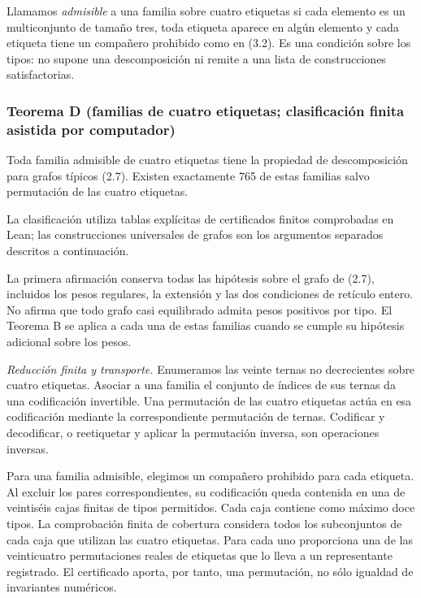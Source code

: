 \documentclass[spanish,11pt,a4paper]{article}
\begin{document}
Llamamos \emph{admisible} a una familia sobre cuatro etiquetas si cada elemento es un multiconjunto de tamaño tres, toda etiqueta aparece en algún elemento y cada etiqueta tiene un compañero prohibido como en (3.2). Es una condición sobre los tipos: no supone una descomposición ni remite a una lista de construcciones satisfactorias.

\subsubsection{Teorema D (familias de cuatro etiquetas; clasificación finita asistida por computador)}\label{teorema-d-familias-de-cuatro-etiquetas-clasificaciuxf3n-finita-asistida-por-computador}

Toda familia admisible de cuatro etiquetas tiene la propiedad de descomposición para grafos típicos (2.7). Existen exactamente 765 de estas familias salvo permutación de las cuatro etiquetas.

La clasificación utiliza tablas explícitas de certificados finitos comprobadas en Lean; las construcciones universales de grafos son los argumentos separados descritos a continuación.

La primera afirmación conserva todas las hipótesis sobre el grafo de (2.7), incluidos los pesos regulares, la extensión y las dos condiciones de retículo entero. No afirma que todo grafo casi equilibrado admita pesos positivos por tipo. El Teorema B se aplica a cada una de estas familias cuando se cumple su hipótesis adicional sobre los pesos.

\emph{Reducción finita y transporte.} Enumeramos las veinte ternas no decrecientes sobre cuatro etiquetas. Asociar a una familia el conjunto de índices de sus ternas da una codificación invertible. Una permutación de las cuatro etiquetas actúa en esa codificación mediante la correspondiente permutación de ternas. Codificar y decodificar, o reetiquetar y aplicar la permutación inversa, son operaciones inversas.

Para una familia admisible, elegimos un compañero prohibido para cada etiqueta. Al excluir los pares correspondientes, su codificación queda contenida en una de veintiséis cajas finitas de tipos permitidos. Cada caja contiene como máximo doce tipos. La comprobación finita de cobertura considera todos los subconjuntos de cada caja que utilizan las cuatro etiquetas. Para cada uno proporciona una de las veinticuatro permutaciones reales de etiquetas que lo lleva a un representante registrado. El certificado aporta, por tanto, una permutación, no sólo igualdad de invariantes numéricos.
\end{document}
